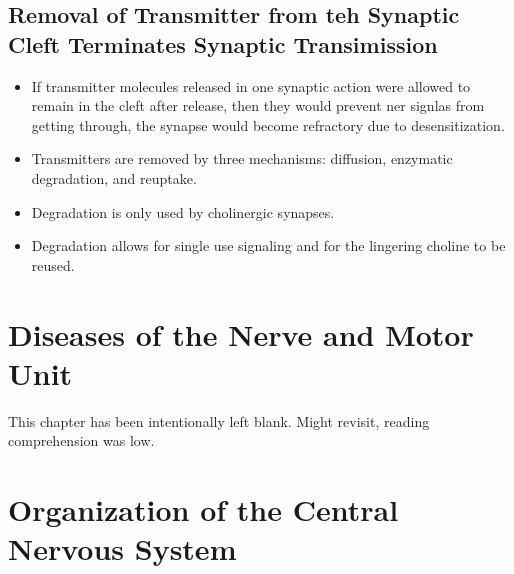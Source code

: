 \documentclass[12pt,a4paper]{article}
\begin{document}
\subsection{Removal of Transmitter from teh Synaptic Cleft Terminates Synaptic Transimission}
\begin{itemize}
    \item If transmitter molecules released in one synaptic action were allowed to remain in the cleft after release, then they would prevent ner signlas from getting through, the synapse would become refractory due to desensitization.
    \item Transmitters are removed by three mechanisms: diffusion, enzymatic degradation, and reuptake.
    \item Degradation is only used by cholinergic synapses.
    \item Degradation allows for single use signaling and for the lingering choline to be reused.
\end{itemize}

\clearpage
\section{Diseases of the Nerve and Motor Unit}
\begin{center}
    This chapter has been intentionally left blank. Might revisit, reading comprehension was low.
\end{center}


\clearpage
{}
\clearpage
\section{Organization of the Central Nervous System}
\end{document}
